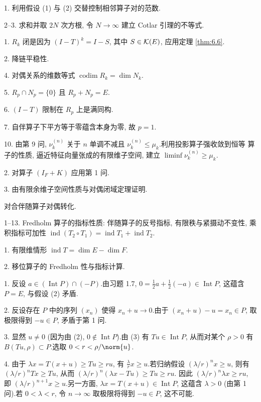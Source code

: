 1. 利用假设 (1) 与 (2) 交替控制相邻算子对的范数.

2--3. 求和并取 $2N$ 次方根, 令 $N\to\infty$ 建立 Cotlar 引理的不等式.


1. $R_k$ 闭是因为 $(I-T)^k=I-S$, 其中 $S\in\mathcal{K}(E)$, 应用定理  \ref{thm:6.6}.

2. 降链平稳性.

4. 对偶关系的维数等式 $\operatorname{codim}R_k=\dim N_k$.

5. $R_p\cap N_p=\{0\}$ 且 $R_p+N_p=E$.

6. $(I-T)$ 限制在 $R_p$ 上是满同构.

7. 自伴算子下平方等于零蕴含本身为零, 故 $p=1$.


10. 由第 9 问, $\nu_k^{(n)}$ 关于 $n$ 单调不减且 $\nu_k^{(n)}\le\mu_k$.利用投影算子强收敛到恒等
算子的性质, 逼近特征向量张成的有限维子空间, 建立 $\liminf\nu_k^{(n)}\ge\mu_k$.



2. 对算子 $(I_F+K)$ 应用第 1 问.

3. 由有限余维子空间性质与对偶闭域定理证明.


对合伴随算子对偶转化.


1--13. Fredholm 算子的指标性质: 伴随算子的反号指标, 有限秩与紧摄动不变性, 乘积指标可加性
$\operatorname{ind}(T_2\circ T_1)=\operatorname{ind}T_1+\operatorname{ind}T_2$.


1. 有限维情形 $\operatorname{ind}T=\dim E-\dim F$.

2. 移位算子的 Fredholm 性与指标计算.


1. 反设 $a\in(\operatorname{Int}P)\cap(-P)$.由习题 1.7, $0=\frac12a+\frac12(-a)\in\operatorname{Int}P$,
这蕴含 $P=E$, 与假设 (2) 矛盾.

2. 反设存在 $P$ 中的序列 $(x_n)$ 使得 $x_n+u\to0$.由于 $(x_n+u)-u=x_n\in P$, 取极限得到
$-u\in P$, 矛盾于第 1 问.

3. 显然 $u\ne0$ (因为由 (2), $0\notin\operatorname{Int}P$).由 (3) 有 $Tu\in\operatorname{Int}P$,
从而对某个 $\rho>0$ 有 $B(Tu,\rho)\subset P$.选取 $0<r<\rho/\norm{u}$.

4. 由于 $\lambda x=T(x+u)\ge Tu\ge ru$, 有 $\frac\lambda r x\ge u$.若归纳假设
$(\lambda/r)^nx\ge u$, 则有 $(\lambda/r)^nTx\ge Tu$, 从而 $(\lambda/r)^n(\lambda x-Tu)\ge Tu\ge ru$.
因此 $(\lambda/r)^n\lambda x\ge ru$, 即 $(\lambda/r)^{n+1}x\ge u$.另一方面,
$\lambda x=T(x+u)\in\operatorname{Int}P$, 这蕴含 $\lambda>0$ (由第 1 问).若 $0<\lambda<r$,
令 $n\to\infty$ 取极限将得到 $-u\in P$, 这不可能.

